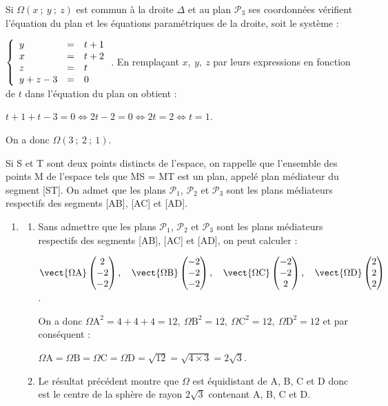 \begin{enumerate}
Si $\Omega(x~;~y~;~z)$ est commun à la droite $\Delta$ et au plan $\mathcal{P}_3$ ses coordonnées vérifient l'équation du plan et les équations paramétriques de la droite, soit le système :

$\left\{\begin{array}{l c l}
y&=&t + 1\\
x &=&t + 2\\
z&=&t\\
y + z - 3&=&0
\end{array}\right.$. En remplaçant $x,\:y,\:z$ par leurs expressions en fonction de $t$ dans l'équation du plan on obtient :

$t + 1 + t - 3= 0 \iff 2t - 2 = 0 \iff 2t = 2 \iff t = 1$.

On a donc $\Omega\left(3~;~2~;~1 \right)$.
\end{enumerate}

\medskip

Si S et T sont deux points distincts de l'espace, on rappelle que l'ensemble des points M de l'espace tels que MS = MT est un plan, appelé plan médiateur du segment [ST]. On admet que les plans $\mathcal{P}_1$,\: $\mathcal{P}_2$ et $\mathcal{P}_3$ sont les plans médiateurs respectifs des segments [AB], [AC] et [AD].

\begin{enumerate}[resume]
\item
	\begin{enumerate}
		\item 
Sans admettre que les plans $\mathcal{P}_1$,\: $\mathcal{P}_2$ et $\mathcal{P}_3$ sont les plans médiateurs respectifs des segments [AB], [AC] et [AD], on peut calculer :

$\vect{\Omega \text{A}}\begin{pmatrix}2\\-2\\-2\end{pmatrix},\quad \vect{\Omega \text{B}}\begin{pmatrix}-2\\-2\\-2\end{pmatrix}, \quad \vect{\Omega \text{C}}\begin{pmatrix}-2\\-2\\2\end{pmatrix},\quad \vect{\Omega \text{D}}\begin{pmatrix}2\\2\\2\end{pmatrix}$.

On a donc $\Omega\text{A}^2 = 4 + 4 + 4 = 12, \: \Omega\text{B}^2 = 12,\: \Omega\text{C}^2 = 12, \: \Omega\text{D}^2 = 12$ et par conséquent :

$\Omega\text{A} = \Omega\text{B} = \Omega\text{C} = \Omega\text{D} = \sqrt{12} = \sqrt{4 \times 3} = 2\sqrt{3}$.
		\item 


Le résultat précédent montre que $\Omega$ est équidistant de A, B, C et D donc est le centre de la sphère de rayon $2\sqrt{3}$ contenant A, B, C et D.
	\end{enumerate}
\end{enumerate}
